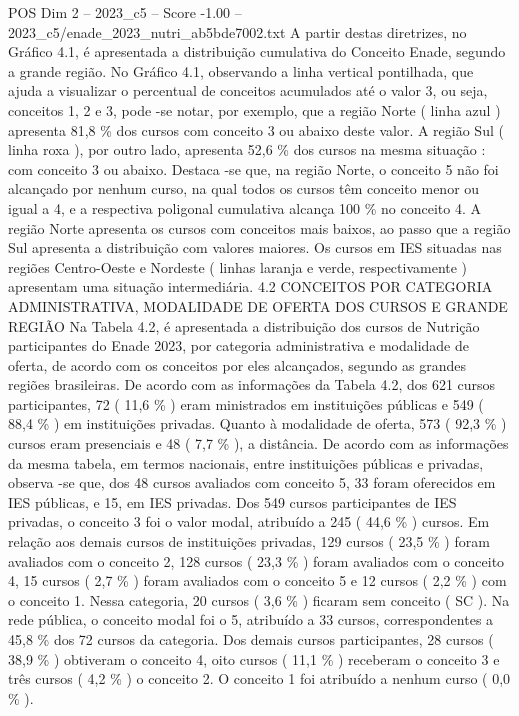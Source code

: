 \begin{textsample}{POS Dim 2 – 2023\_c5 – Score -1.00 – 2023\_c5/enade\_2023\_nutri\_ab5bde7002.txt}
A partir destas diretrizes, no Gráfico 4.1, é apresentada a distribuição cumulativa do Conceito Enade, segundo a grande região.
No Gráfico 4.1, observando a linha vertical pontilhada, que ajuda a visualizar o percentual de conceitos acumulados até o valor 3, ou seja, conceitos 1, 2 e 3, pode -se notar, por exemplo, que a região Norte ( linha azul ) apresenta 81,8 \% dos cursos com conceito 3 ou abaixo deste valor.
A região Sul ( linha roxa ), por outro lado, apresenta 52,6 \% dos cursos na mesma situação : com conceito 3 ou abaixo.
Destaca -se que, na região Norte, o conceito 5 não foi alcançado por nenhum curso, na qual todos os cursos têm conceito menor ou igual a 4, e a respectiva poligonal cumulativa alcança 100 \% no conceito 4.
A região Norte apresenta os cursos com conceitos mais baixos, ao passo que a região Sul apresenta a distribuição com valores maiores.
Os cursos em IES situadas nas regiões Centro-Oeste e Nordeste ( linhas laranja e verde, respectivamente ) apresentam uma situação intermediária. 4.2 CONCEITOS POR CATEGORIA ADMINISTRATIVA, MODALIDADE DE OFERTA DOS CURSOS E GRANDE REGIÃO Na Tabela 4.2, é apresentada a distribuição dos cursos de Nutrição participantes do Enade 2023, por categoria administrativa e modalidade de oferta, de acordo com os conceitos por eles alcançados, segundo as grandes regiões brasileiras.
De acordo com as informações da Tabela 4.2, dos 621 cursos participantes, 72 ( 11,6 \% ) eram ministrados em instituições públicas e 549 ( 88,4 \% ) em instituições privadas.
Quanto à modalidade de oferta, 573 ( 92,3 \% ) cursos eram presenciais e 48 ( 7,7 \% ), a distância.
De acordo com as informações da mesma tabela, em termos nacionais, entre instituições públicas e privadas, observa -se que, dos 48 cursos avaliados com conceito 5, 33 foram oferecidos em IES públicas, e 15, em IES privadas.
Dos 549 cursos participantes de IES privadas, o conceito 3 foi o valor modal, atribuído a 245 ( 44,6 \% ) cursos.
Em relação aos demais cursos de instituições privadas, 129 cursos ( 23,5 \% ) foram avaliados com o conceito 2, 128 cursos ( 23,3 \% ) foram avaliados com o conceito 4, 15 cursos ( 2,7 \% ) foram avaliados com o conceito 5 e 12 cursos ( 2,2 \% ) com o conceito 1.
Nessa categoria, 20 cursos ( 3,6 \% ) ficaram sem conceito ( SC ).
Na rede pública, o conceito modal foi o 5, atribuído a 33 cursos, correspondentes a 45,8 \% dos 72 cursos da categoria.
Dos demais cursos participantes, 28 cursos ( 38,9 \% ) obtiveram o conceito 4, oito cursos ( 11,1 \% ) receberam o conceito 3 e três cursos ( 4,2 \% ) o conceito 2.
O conceito 1 foi atribuído a nenhum curso ( 0,0 \% ).

\end{textsample}
